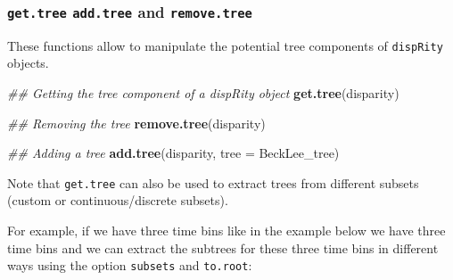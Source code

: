 \documentclass[
]{book}
\newenvironment{Shaded}{\begin{snugshade}}{\end{snugshade}}
\newcommand{\CommentTok}[1]{\textcolor[rgb]{0.56,0.35,0.01}{\textit{#1}}}
\newcommand{\DataTypeTok}[1]{\textcolor[rgb]{0.13,0.29,0.53}{#1}}
\newcommand{\KeywordTok}[1]{\textcolor[rgb]{0.13,0.29,0.53}{\textbf{#1}}}
\newcommand{\NormalTok}[1]{#1}
\begin{document}
\hypertarget{get.tree-add.tree-and-remove.tree}{%
\subsubsection{\texorpdfstring{\texttt{get.tree} \texttt{add.tree} and \texttt{remove.tree}}{get.tree add.tree and remove.tree}}\label{get.tree-add.tree-and-remove.tree}}

These functions allow to manipulate the potential tree components of \texttt{dispRity} objects.

\begin{Shaded}
\begin{Highlighting}[]
\CommentTok{\#\# Getting the tree component of a dispRity object}
\KeywordTok{get.tree}\NormalTok{(disparity)}

\CommentTok{\#\# Removing the tree}
\KeywordTok{remove.tree}\NormalTok{(disparity)}

\CommentTok{\#\# Adding a tree}
\KeywordTok{add.tree}\NormalTok{(disparity, }\DataTypeTok{tree =}\NormalTok{ BeckLee\_tree)}
\end{Highlighting}
\end{Shaded}

Note that \texttt{get.tree} can also be used to extract trees from different subsets (custom or continuous/discrete subsets).

For example, if we have three time bins like in the example below we have three time bins and we can extract the subtrees for these three time bins in different ways using the option \texttt{subsets} and \texttt{to.root}:
\end{document}
